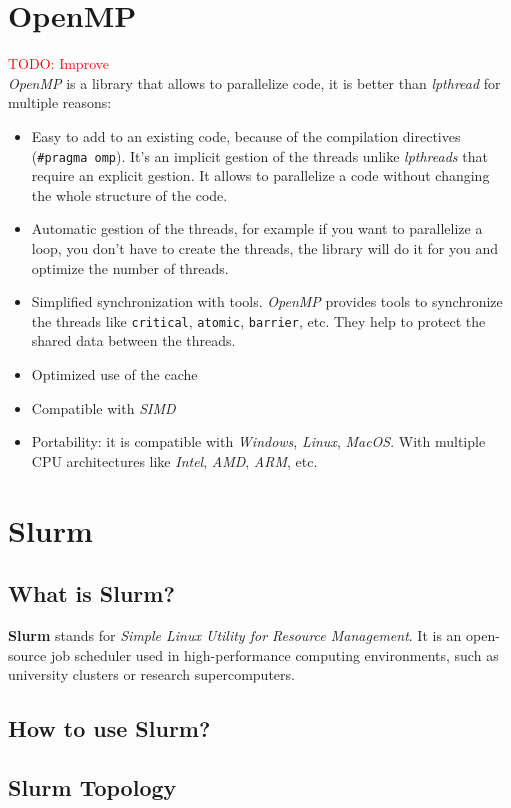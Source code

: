 \documentclass[12pt, openany]{report}
\theoremstyle{definition}
\begin{document}
\section{OpenMP}\label{OpenMP}
\textcolor{red}{TODO: Improve}\\
\textit{OpenMP} is a library that allows to parallelize code, it is better than \textit{lpthread} for multiple reasons:
\begin{itemize}
	\item Easy to add to an existing code, because of the compilation directives (\texttt{\#pragma omp}). It's an implicit gestion of the threads unlike \textit{lpthreads} that require an explicit gestion. It allows to parallelize a code without changing the whole structure of the code.
	\item Automatic gestion of the threads, for example if you want to parallelize a loop, you don't have to create the threads, the library will do it for you and optimize the number of threads.
	\item Simplified synchronization with tools. \textit{OpenMP} provides tools to synchronize the threads like \texttt{critical}, \texttt{atomic}, \texttt{barrier}, etc. They help to protect the shared data between the threads.
	\item Optimized use of the cache
	\item Compatible with \textit{SIMD}
	\item Portability: it is compatible with \textit{Windows}, \textit{Linux}, \textit{MacOS}. With multiple CPU architectures like \textit{Intel}, \textit{AMD}, \textit{ARM}, etc.
\end{itemize}
\section{Slurm}
\subsection{What is Slurm?}
\textbf{Slurm} stands for \textit{Simple Linux Utility for Resource Management}. It is an open-source job scheduler used in high-performance computing environments, such as university clusters or research supercomputers.
\subsection{How to use Slurm?}
\subsection{Slurm Topology}
\end{document}
